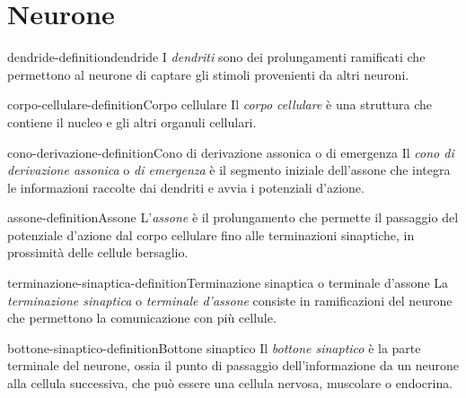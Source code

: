 \documentclass[preview]{standalone}
\begin{document}
\section{Neurone}

\begin{snippetdefinition}{dendride-definition}{dendride}
    I \textit{dendriti} sono dei prolungamenti ramificati che
    permettono al neurone di captare gli stimoli provenienti da altri
    neuroni.
\end{snippetdefinition}

\begin{snippetdefinition}{corpo-cellulare-definition}{Corpo cellulare}
    Il \textit{corpo cellulare} è una struttura che contiene
    il nucleo e gli altri organuli cellulari.
\end{snippetdefinition}

\begin{snippetdefinition}{cono-derivazione-definition}{Cono di derivazione assonica o di emergenza}
    Il \textit{cono di derivazione assonica} o \textit{di emergenza}    
    è il segmento iniziale dell'assone che integra le informazioni
    raccolte dai dendriti e avvia i potenziali d'azione.
\end{snippetdefinition}

\begin{snippetdefinition}{assone-definition}{Assone}
    L'\textit{assone} è il prolungamento che permette il passaggio del
    potenziale d'azione dal corpo cellulare fino
    alle terminazioni sinaptiche, in prossimità delle cellule bersaglio.
\end{snippetdefinition}

\begin{snippetdefinition}{terminazione-sinaptica-definition}{Terminazione sinaptica o terminale d'assone}
    La \textit{terminazione sinaptica} o \textit{terminale d'assone}
    consiste in ramificazioni del neurone che permettono
    la comunicazione con più cellule.
\end{snippetdefinition}

\begin{snippetdefinition}{bottone-sinaptico-definition}{Bottone sinaptico}
    Il \textit{bottone sinaptico} è la parte terminale del neurone,
    ossia il punto di passaggio dell'informazione da un neurone
    alla cellula successiva, che può essere una cellula nervosa,
    muscolare o endocrina.
\end{snippetdefinition}
\end{document}
